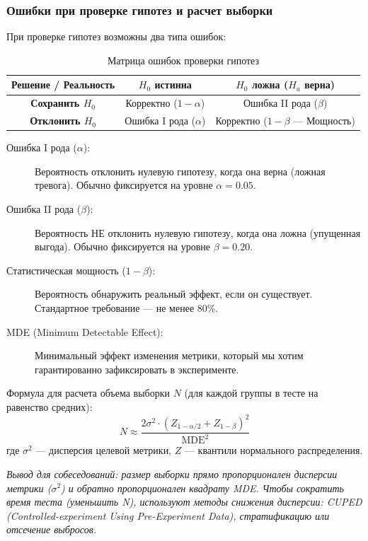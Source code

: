 \documentclass[12pt]{article}
\newcommand{\commentary}[1]{{\small\itshape\color{commentgray} #1}}
\begin{document}
\subsubsection{Ошибки при проверке гипотез и расчет выборки}

При проверке гипотез возможны два типа ошибок:
\begin{table}[h]
\centering
\begin{tabular}{@{}ccc@{}}
\toprule
\textbf{Решение / Реальность} & \textbf{$H_0$ истинна} & \textbf{$H_0$ ложна ($H_a$ верна)} \\ \midrule
\textbf{Сохранить $H_0$} & Корректно ($1 - \alpha$) & Ошибка II рода ($\beta$) \\
\textbf{Отклонить $H_0$} & Ошибка I рода ($\alpha$) & Корректно ($1 - \beta$ --- Мощность) \\ \bottomrule
\end{tabular}
\caption{Матрица ошибок проверки гипотез}
\end{table}

\begin{description}
    \item[Ошибка I рода ($\alpha$):] Вероятность отклонить нулевую гипотезу, когда она верна (ложная тревога). Обычно фиксируется на уровне $\alpha = 0.05$.
    \item[Ошибка II рода ($\beta$):] Вероятность НЕ отклонить нулевую гипотезу, когда она ложна (упущенная выгода). Обычно фиксируется на уровне $\beta = 0.20$.
    \item[Статистическая мощность ($1 - \beta$):] Вероятность обнаружить реальный эффект, если он существует. Стандартное требование --- не менее 80\%.
    \item[MDE (Minimum Detectable Effect):] Минимальный эффект изменения метрики, который мы хотим гарантированно зафиксировать в эксперименте.
\end{description}

Формула для расчета объема выборки $N$ (для каждой группы в тесте на равенство средних):
\begin{equation}
    N \approx \frac{2 \sigma^2 \cdot (Z_{1-\alpha/2} + Z_{1-\beta})^2}{\text{MDE}^2}
\end{equation}
где $\sigma^2$ --- дисперсия целевой метрики, $Z$ --- квантили нормального распределения.

\commentary{Вывод для собеседований: размер выборки прямо пропорционален дисперсии метрики ($\sigma^2$) и обратно пропорционален квадрату MDE. Чтобы сократить время теста (уменьшить N), используют методы снижения дисперсии: CUPED (Controlled-experiment Using Pre-Experiment Data), стратификацию или отсечение выбросов.}
\end{document}
